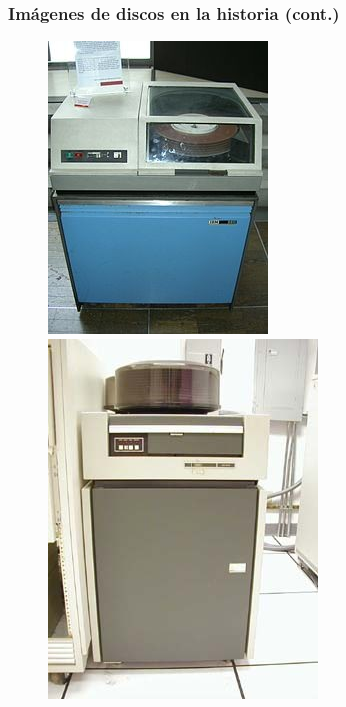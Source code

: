 \begin{frame}
  \frametitle{Imágenes de discos en la historia (cont.)}
  \begin{figure}
    \includegraphics[scale=0.4]{images/oldDisk3.png}
    \includegraphics[scale=0.4]{images/oldDisk4.png}
  \end{figure}
\end{frame}

